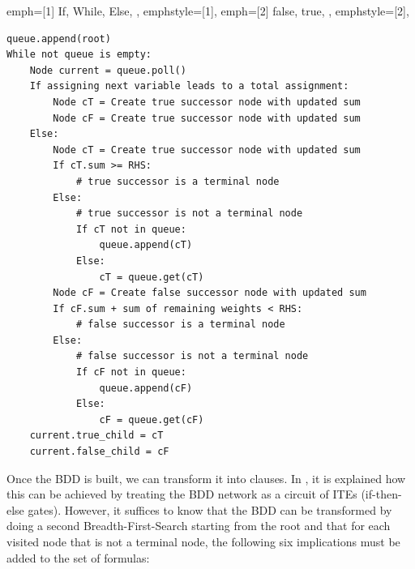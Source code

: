 {
\lstset%
{%
    emph=[1]%
    {%
        If,
        While,
        Else,
    },
    emphstyle=[1]{\bfseries},
    emph=[2]%
    {%
       false,
       true,
    },
  emphstyle=[2]{\textit{}\ttfamily},
}
\begin{lstlisting}[frame=single,caption={Pseudo Code of BDD construction},captionpos=b, label=CodeBDDConstruction]
queue.append(root)
While not queue is empty:
    Node current = queue.poll()
    If assigning next variable leads to a total assignment:
        Node cT = Create true successor node with updated sum
        Node cF = Create true successor node with updated sum
    Else:
        Node cT = Create true successor node with updated sum
        If cT.sum >= RHS:
            # true successor is a terminal node
        Else:
            # true successor is not a terminal node
            If cT not in queue:
                queue.append(cT)
            Else:
                cT = queue.get(cT)
        Node cF = Create false successor node with updated sum
        If cF.sum + sum of remaining weights < RHS:
            # false successor is a terminal node
        Else:
            # false successor is not a terminal node
            If cF not in queue:
                queue.append(cF)
            Else:
                cF = queue.get(cF)
    current.true_child = cT
    current.false_child = cF
\end{lstlisting}
}

Once the BDD is built, we can transform it into clauses. In \cite{Een2006TranslatingPC}, it is explained how this can be achieved by treating the BDD network as a circuit of ITEs (if-then-else gates). However, it suffices to know that the BDD can be transformed by doing a second Breadth-First-Search starting from the root and that for each visited node that is not a terminal node, the following six implications must be added to the set of formulas:

